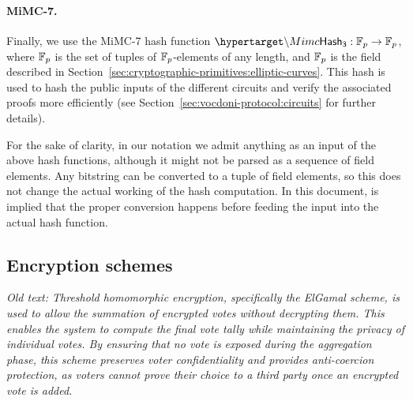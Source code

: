 \paragraph{MiMC-7.} Finally, we use the MiMC-7 hash function $\hlset{\Mimc} : \F_p \rightarrow \F_p$, where $\mathbb{F}_p$ is the set of tuples of $\mathbb{F}_p$-elements of any length, and $\mathbb{F}_p$ is the field described in Section~\ref{sec:cryptographic-primitives:elliptic-curves}. This hash is used to hash the public inputs of the different circuits and verify the associated proofs more efficiently (see Section~\ref{sec:vocdoni-protocol:circuits} for further details).



For the sake of clarity, in our notation we admit anything as an input of the above hash functions, although it might not be parsed as a sequence of field elements. Any bitstring can be converted to a tuple of field elements, so this does not change the actual working of the hash computation. In this document, is implied that the proper conversion happens before feeding the input into the actual hash function.



\subsection{Encryption schemes}
\label{sec:cryptographic-primitives:encryption}

\textit{Old text: Threshold homomorphic encryption, specifically the ElGamal scheme, is used to allow the summation of encrypted votes without decrypting them. This enables the system to compute the final vote tally while maintaining the privacy of individual votes. By ensuring that no vote is exposed during the aggregation phase, this scheme preserves voter confidentiality and provides anti-coercion protection, as voters cannot prove their choice to a third party once an encrypted vote is added.}\\

